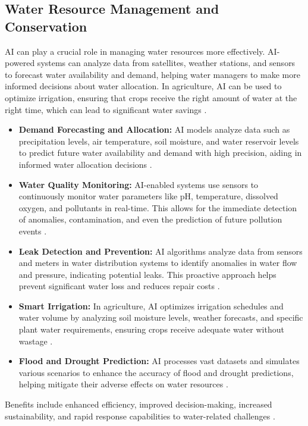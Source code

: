 \subsection{Water Resource Management and Conservation}
AI can play a crucial role in managing water resources more effectively. AI-powered systems can analyze data from satellites, weather stations, and sensors to forecast water availability and demand, helping water managers to make more informed decisions about water allocation. In agriculture, AI can be used to optimize irrigation, ensuring that crops receive the right amount of water at the right time, which can lead to significant water savings \cite{goyal2020review}.
\begin{itemize}
    \item \textbf{Demand Forecasting and Allocation:} AI models analyze data such as precipitation levels, air temperature, soil moisture, and water reservoir levels to predict future water availability and demand with high precision, aiding in informed water allocation decisions \cite{AuctoresOnline_WaterRes, EFCNetwork_WaterRes}.
    \item \textbf{Water Quality Monitoring:} AI-enabled systems use sensors to continuously monitor water parameters like pH, temperature, dissolved oxygen, and pollutants in real-time. This allows for the immediate detection of anomalies, contamination, and even the prediction of future pollution events \cite{DigitalDefynd_WaterRes, Arkkosoft_WaterRes}.
    \item \textbf{Leak Detection and Prevention:} AI algorithms analyze data from sensors and meters in water distribution systems to identify anomalies in water flow and pressure, indicating potential leaks. This proactive approach helps prevent significant water loss and reduces repair costs \cite{SandTech_WaterRes, SmartWaterMagazine_WaterRes}.
    \item \textbf{Smart Irrigation:} In agriculture, AI optimizes irrigation schedules and water volume by analyzing soil moisture levels, weather forecasts, and specific plant water requirements, ensuring crops receive adequate water without wastage \cite{SustainabilityLinkedIn_WaterRes, WhiteCase_WaterRes}.
    \item \textbf{Flood and Drought Prediction:} AI processes vast datasets and simulates various scenarios to enhance the accuracy of flood and drought predictions, helping mitigate their adverse effects on water resources \cite{Medium_WaterRes}.
\end{itemize}
Benefits include enhanced efficiency, improved decision-making, increased sustainability, and rapid response capabilities to water-related challenges \cite{UPPCSMagazine_WaterRes}.

